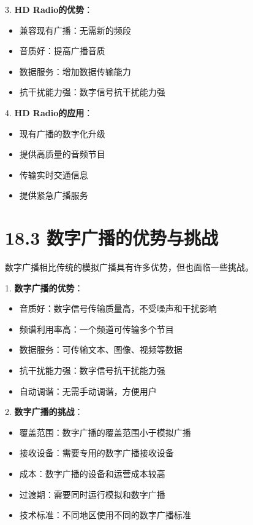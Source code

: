 \documentclass[12pt,UTF8]{ctexbook}
\begin{document}
3. \textbf{HD Radio的优势}：
   \begin{itemize}[leftmargin=3.5em]
   \item 兼容现有广播：无需新的频段
   \item 音质好：提高广播音质
   \item 数据服务：增加数据传输能力
   \item 抗干扰能力强：数字信号抗干扰能力强
   \end{itemize}

4. \textbf{HD Radio的应用}：
   \begin{itemize}[leftmargin=3.5em]
   \item 现有广播的数字化升级
   \item 提供高质量的音频节目
   \item 传输实时交通信息
   \item 提供紧急广播服务
   \end{itemize}

\section*{18.3 数字广播的优势与挑战}

数字广播相比传统的模拟广播具有许多优势，但也面临一些挑战。

1. \textbf{数字广播的优势}：
   \begin{itemize}[leftmargin=3.5em]
   \item 音质好：数字信号传输质量高，不受噪声和干扰影响
   \item 频谱利用率高：一个频道可传输多个节目
   \item 数据服务：可传输文本、图像、视频等数据
   \item 抗干扰能力强：数字信号抗干扰能力强
   \item 自动调谐：无需手动调谐，方便用户
   \end{itemize}

2. \textbf{数字广播的挑战}：
   \begin{itemize}[leftmargin=3.5em]
   \item 覆盖范围：数字广播的覆盖范围小于模拟广播
   \item 接收设备：需要专用的数字广播接收设备
   \item 成本：数字广播的设备和运营成本较高
   \item 过渡期：需要同时运行模拟和数字广播
   \item 技术标准：不同地区使用不同的数字广播标准
   \end{itemize}
\end{document}
